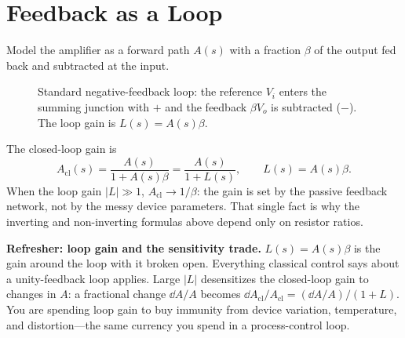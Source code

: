 \section{Feedback as a Loop}
Model the amplifier as a forward path \(A(s)\) with a fraction \(\beta\) of the
output fed back and subtracted at the input.

\begin{figure}[htbp]
\centering
{}
\caption{Standard negative-feedback loop: the reference \(V_i\) enters the summing
junction with \(+\) and the feedback \(\beta V_o\) is subtracted (\(-\)). The loop
gain is \(L(s)=A(s)\beta\).}
\label{fig:feedback-loop}
\end{figure}

The closed-loop gain is
\[
A_{\text{cl}}(s)=\frac{A(s)}{1+A(s)\beta}
=\frac{A(s)}{1+L(s)},
\qquad
L(s)=A(s)\beta .
\]
When the loop gain \(|L|\gg1\), \(A_{\text{cl}}\to 1/\beta\): the gain is set by
the passive feedback network, not by the messy device parameters. That single
fact is why the inverting and non-inverting formulas above depend only on
resistor ratios.

\begin{controlsbox}
\textbf{Refresher: loop gain and the sensitivity trade.} \(L(s)=A(s)\beta\) is the
gain around the loop with it broken open. Everything classical control says about
a unity-feedback loop applies. Large \(|L|\) desensitizes the closed-loop gain to
changes in \(A\): a fractional change \(\dd A/A\) becomes \(\dd A_{\text{cl}}/
A_{\text{cl}}=(\dd A/A)/(1+L)\). You are spending loop gain to buy immunity from
device variation, temperature, and distortion---the same currency you spend in a
process-control loop.
\end{controlsbox}

